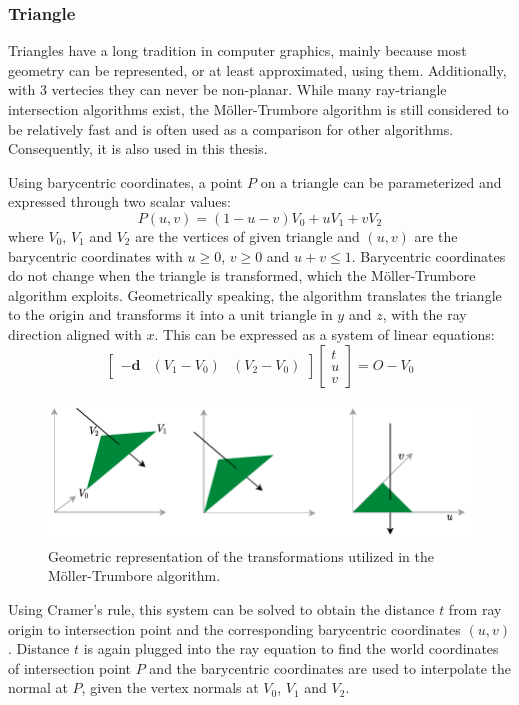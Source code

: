 \subsubsection{Triangle}
Triangles have a long tradition in computer graphics, mainly because most geometry can be represented, or at least approximated, using them. Additionally, with 3 vertecies they can never be non-planar. While many ray-triangle intersection algorithms exist, the M{\"o}ller-Trumbore algorithm\cite{moeller97triangle} is still considered to be relatively fast and is often used as a comparison for other algorithms. Consequently, it is also used in this thesis. 

Using barycentric coordinates, a point $P$ on a triangle can be parameterized and expressed through two scalar values:
\[
    P(u,v) = (1-u-v)V_0 + uV_1 + vV_2
\]
where $V_0$, $V_1$ and $V_2$ are the vertices of given triangle and $(u,v)$ are the barycentric coordinates with $u\geq0$,  $v\geq0$ and $u+v\leq1$. Barycentric coordinates do not change when the triangle is transformed, which the M{\"o}ller-Trumbore algorithm exploits. Geometrically speaking, the algorithm translates the triangle to the origin and transforms it into a unit triangle in $y$ and $z$, with the ray direction aligned with $x$. This can be expressed as a system of linear equations:
\[
    \left[ \begin{array}{rrr}-\textbf{d}&(V_1-V_0)&(V_2-V_0)\end{array} \right]
    \left[ \begin{array}{r}t\\u\\v\end{array} \right] = O - V_0
\]
\begin{figure}[H]
    \centering
    \includegraphics[width=400pt]{images/ray_triangle_intersec.pdf}
    \caption{Geometric representation of the transformations utilized in the M{\"o}ller-Trumbore algorithm.}
    \label{fig:triangle_intersec}
\end{figure}
Using Cramer's rule\cite{brunetti14cramersRule}, this system can be solved to obtain the distance $t$ from ray origin to intersection point and the corresponding barycentric coordinates $(u,v)$. Distance $t$ is again plugged into the ray equation to find the world coordinates of intersection point $P$ and the barycentric coordinates are used to interpolate the normal at $P$, given the vertex normals at $V_0$, $V_1$ and $V_2$.


